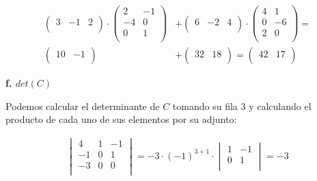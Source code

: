 \documentclass[11pt]{article}
\begin{document}
\begin{align*}
  \begin{pmatrix}
    3 & -1 & 2 \\
  \end{pmatrix}
  \cdot
  \begin{pmatrix}
    2  & -1 \\
    -4 & 0  \\
    0  & 1  \\
  \end{pmatrix}
   & +
  \begin{pmatrix}
    6 & -2 & 4 \\
  \end{pmatrix}
  \cdot
  \begin{pmatrix}
    4 & 1  \\
    0 & -6 \\
    2 & 0  \\
  \end{pmatrix}
  =    \\
  \begin{pmatrix}
    10 & -1 \\
  \end{pmatrix}
   & +
  \begin{pmatrix}
    32 & 18 \\
  \end{pmatrix}
  =
  \boxed{
    \begin{pmatrix}
      42 & 17 \\
    \end{pmatrix}
  }
\end{align*}

\textbf{f. \(det(C)\)}

Podemos calcular el determinante de \(C\) tomando su fila 3
y calculando el producto de cada uno de sus elementos por su adjunto:

\begin{align*}
  \begin{vmatrix}
    4  & 1 & -1 \\
    -1 & 0 & 1  \\
    -3 & 0 & 0  \\
  \end{vmatrix}
  =
  -3
  \cdot
  (-1)^{3+1}
  \cdot
  \begin{vmatrix}
    1 & -1 \\
    0 & 1  \\
  \end{vmatrix}
  = \boxed{-3}
\end{align*}
\end{document}
